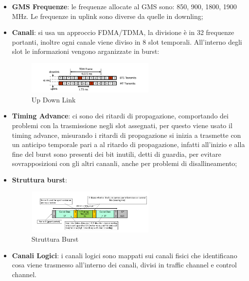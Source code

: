 \documentclass[12pt]{article}
\begin{document}
\begin{itemize}
\begin{itemize}
            \item VLS (Visitor Location Register): contiene le informazioni legati ad un MT presente in quel momento nella rete, mantiene i valori quando l'utente si \`e spostato;
            \item AuC (Authentication Center): tramite una tecnologia challange and response, l'utente si pu\`o autenticare;
            \item EIR (Equipmente Identity Register): mantiene un registro di tutti i dispositivi rubati;
        \end{itemize}
    \item \textbf{GMS Frequenze}: le frequenze allocate al GMS sono: 850, 900, 1800, 1900 MHz. Le frequenze in uplink sono diverse da quelle in downling;
    \item \textbf{Canali}: si usa un approccio FDMA/TDMA, la divisione \`e in 32 frequenze portanti, inoltre ogni canale viene diviso in 8 slot temporali. All'interno degli slot le informazioni vengono arganizzate in burst:
        \begin{figure}[H]
            \centering
            \includegraphics[width=0.6\textwidth]{up-down-link.png}
            \caption{Up Down Link}
            \label{fig:up-down-link}
        \end{figure}
    \item \textbf{Timing Advance}: ci sono dei ritardi di propagazione, comportando dei problemi con la trasmissione negli slot assegnati, per questo viene usato il timing advance, misurando i ritardi di propagazione si inizia a trasmette con un anticipo temporale pari a al ritardo di propagazione, infatti all'inizio e alla fine del burst sono presenti dei bit inutili, detti di guardia, per evitare sovrapposizioni con gli altri cananli, anche per problemi di disallineamento;
    \item \textbf{Struttura burst}:
        \begin{figure}[H]
            \centering
            \includegraphics[width=0.6\textwidth]{struttura-burst.png}
            \caption{Struttura Burst}
            \label{fig:struttura-burst}
        \end{figure}
    \item \textbf{Canali Logici}: i canali logici sono mappati sui canali fisici che identificano cosa viene trasmesso all'interno dei canali, divisi in traffic channel e control channel.
\end{itemize}
\end{document}
